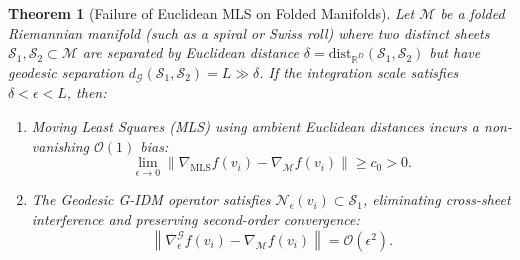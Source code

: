 \documentclass[11pt,a4paper]{article}
\newtheorem{theorem}{Theorem}
\theoremstyle{definition}
\begin{document}
\begin{theorem}[Failure of Euclidean MLS on Folded Manifolds]
\label{thm:mls_failure}
Let $\mathcal{M}$ be a folded Riemannian manifold (such as a spiral or Swiss roll) where two distinct sheets $\mathcal{S}_1, \mathcal{S}_2 \subset \mathcal{M}$ are separated by Euclidean distance $\delta = \text{dist}_{\mathbb{R}^D}(\mathcal{S}_1, \mathcal{S}_2)$ but have geodesic separation $d_{\mathcal{G}}(\mathcal{S}_1, \mathcal{S}_2) = L \gg \delta$.
If the integration scale satisfies $\delta < \epsilon < L$, then:
\begin{enumerate}
    \item Moving Least Squares (MLS) using ambient Euclidean distances incurs a non-vanishing $\mathcal{O}(1)$ bias:
    \begin{equation}
    \lim_{\epsilon \to 0} \left\| \nabla_{\text{MLS}} f(v_i) - \nabla_{\mathcal{M}} f(v_i) \right\| \ge c_0 > 0.
    \end{equation}
    \item The Geodesic G-IDM operator satisfies $\mathcal{N}_\epsilon(v_i) \subset \mathcal{S}_1$, eliminating cross-sheet interference and preserving second-order convergence:
    \begin{equation}
    \left\| \nabla_\epsilon^{\mathcal{G}} f(v_i) - \nabla_{\mathcal{M}} f(v_i) \right\| = \mathcal{O}(\epsilon^2).
    \end{equation}
\end{enumerate}
\end{theorem}
\end{document}
